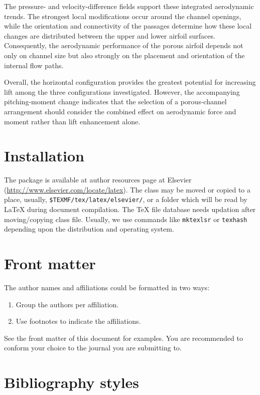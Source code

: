 \documentclass[a4paper,fleqn]{cas-dc}
\begin{document}
The pressure- and velocity-difference fields support these integrated
aerodynamic trends. The strongest local modifications occur around the
channel openings, while the orientation and connectivity of the
passages determine how these local changes are distributed between the
upper and lower airfoil surfaces. Consequently, the aerodynamic
performance of the porous airfoil depends not only on channel size but
also strongly on the placement and orientation of the internal flow
paths.

Overall, the horizontal configuration provides the greatest potential
for increasing lift among the three configurations investigated.
However, the accompanying pitching-moment change indicates that the
selection of a porous-channel arrangement should consider the combined
effect on aerodynamic force and moment rather than lift enhancement
alone.
\section{Installation}

The package is available at author resources page at Elsevier
(\url{http://www.elsevier.com/locate/latex}).
The class may be moved or copied to a place, usually,\linebreak
\verb+$TEXMF/tex/latex/elsevier/+, %
or a folder which will be read                   
by \LaTeX{} during document compilation.  The \TeX{} file
database needs updation after moving/copying class file.  Usually,
we use commands like \verb+mktexlsr+ or \verb+texhash+ depending
upon the distribution and operating system.

\section{Front matter}

The author names and affiliations could be formatted in two ways:
\begin{enumerate}[(1)]
	\item Group the authors per affiliation.
	\item Use footnotes to indicate the affiliations.
\end{enumerate}
See the front matter of this document for examples. 
You are recommended to conform your choice to the journal you 
are submitting to.

\section{Bibliography styles}
\end{document}
